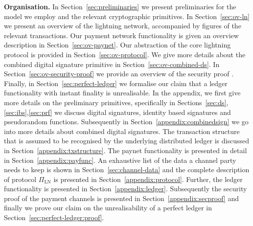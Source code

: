 \noindent \textbf{Organisation.} In Section~\ref{sec:preliminaries} we present
preliminaries for the model we employ and the relevant cryptographic primitives.
In Section~\ref{sec:ov-ln} we present an overview of the lightning network,
accompanied by figures of the relevant transactions. Our payment network
functionality is given an overview description in Section~\ref{sec:ov-paynet}.
Our abstraction of the core lightning protocol is provided in
Section~\ref{sec:ov-protocol}. We give more details about the combined digital
signature primitive in Section~\ref{sec:ov-combined-ds}. In
Section~\ref{sec:ov-security-proof} we provide an overview of the security
proof . Finally, in
Section~\ref{sec:perfect-ledger} we formalise our claim that a ledger
functionality with instant finality is unrealisable. In the appendix, we first
give more details on the preliminary primitives, specifically in
Sections~\ref{sec:ds},\ref{sec:ibs},\ref{sec:prf} we discuss digital signatures,
identity based signatures and pseudorandom functions. Subsequently in
Section~\ref{appendix:combinedsign} we go into more details about combined
digital signatures. The transaction structure that is assumed to be recognised
by the underlying distributed ledger is discussed in
Section~\ref{appendix:txstructure}. The paynet functionality is presented in
detail in Section~\ref{appendix:payfunc}. An exhaustive list of the data a
channel party needs to keep is shown in Section~\ref{sec:channel-data} and the
complete description of protocol $\Pi_{\mathrm{LN}}$ is presented in
Section~\ref{appendix:protocol}. Further, the ledger functionality is presented
in Section~\ref{appendix:ledger}. Subsequently the security proof of the payment
channels is presented in Section~\ref{appendix:secproof} and finally we prove
our claim on the unrealisability of a perfect ledger in
Section~\ref{sec:perfect-ledger:proof}.
